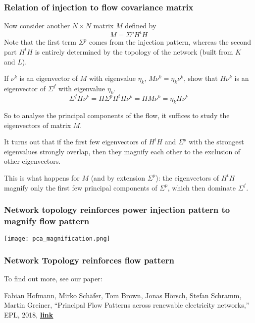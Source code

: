 \documentclass[10pt,aspectratio=169,dvipsnames]{beamer}
\begin{document}
\begin{frame}
  \frametitle{Relation of injection to flow covariance matrix}
  Now consider another $N\times N$ matrix $M$ defined by
  \begin{equation*}
    M = \Sigma^p H^tH
  \end{equation*}
  Note that the first term $\Sigma^p$ comes from the injection
  pattern, whereas the second part $H^tH$ is entirely determined by
  the topology of the network (built from $K$ and $L$).

  If $\nu^k$ is an eigenvector of $M$ with eigenvalue $\eta_k$, $M\nu^k = \eta_k \nu^k$, show that $H\nu^k$ is an eigenvector of $\Sigma^f$ with eigenvalue $\eta_k$.
  \pause
  \begin{equation*}
    \Sigma^f H\nu^k = H \Sigma^p H^t H \nu^k = H M \nu^k = \eta_k H\nu^k
  \end{equation*}

  So to analyse the principal components of the flow, it suffices to study the eigenvectors of matrix $M$.

  It turns out that if the first few eigenvectors of $H^t H$ and
  $\Sigma^p$ with the strongest eigenvalues strongly overlap, then they magnify each other to the
  exclusion of other eigenvectors.

  This is what happens for $M$ (and by extension $\Sigma^p$): the eigenvectors of $H^tH$ magnify only the first few principal components of $\Sigma^p$, which then dominate $\Sigma^f$.

\end{frame}

\begin{frame}
  \frametitle{Network topology reinforces power injection pattern to magnify flow pattern}

  \centering
  \texttt{[image: pca\_magnification.png]}

\end{frame}



\begin{frame}
  \frametitle{Network Topology reinforces flow pattern}

  To find out more, see our paper:

  Fabian Hofmann, Mirko Schäfer, Tom Brown, Jonas Hörsch, Stefan Schramm, Martin Greiner, ``Principal Flow Patterns across renewable electricity networks,'' EPL, 2018, \href{https://arxiv.org/abs/1807.07771}{\bf\color{blue}\underline{link}}

\end{frame}
\end{document}
